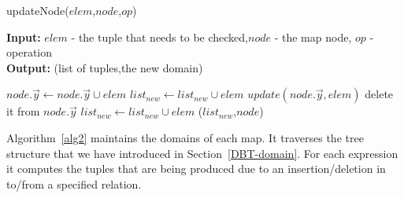 \documentclass[12pt]{article}
\begin{document}
\begin{algorithm}[H]
\caption{updateNode($elem$,$node$,$op$)}
\label{alg6}
\textbf{Input:} $elem$ - the tuple that needs to be checked,$node$ - the map node, $op$ - operation\\
\textbf{Output:} (list of tuples,the new domain)\\
\begin{algorithmic}[1]
\STATE $node.\vec{y}\gets node.\vec{y} \cup elem$
\STATE $list_{new}\gets list_{new}\cup elem$
\ENDIF
\ELSE
{}
\STATE $update(node.\vec{y},elem)$
\STATE delete it from $node.\vec{y}$
\STATE $list_{new}\gets list_{new}\cup elem$
\ENDIF
\ENDIF
\ENDIF
\RETURN ($list_{new}$,$node$)
\end{algorithmic}
\end{algorithm}\textbf{}

Algorithm~\ref{alg2} maintains the domains of each map. It traverses the tree structure that we have introduced in Section~\ref{DBT-domain}. For each expression it computes the tuples that are being produced due to an insertion/deletion in to/from a specified relation.
\end{document}
